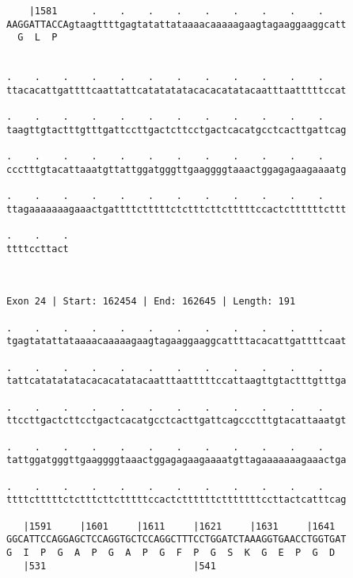 \documentclass{article}
\begin{document}
\begin{Verbatim}
    |1581      .    .    .    .    .    .    .    .    .    
AAGGATTACCAgtaagttttgagtatattataaaacaaaaagaagtagaaggaaggcatt
  G  L  P                                                   
                                                            
  
.    .    .    .    .    .    .    .    .    .    .    .    
ttacacattgattttcaattattcatatatatacacacatatacaatttaatttttccat
                                                            
.    .    .    .    .    .    .    .    .    .    .    .    
taagttgtactttgtttgattccttgactcttcctgactcacatgcctcacttgattcag
                                                            
.    .    .    .    .    .    .    .    .    .    .    .    
ccctttgtacattaaatgttattggatgggttgaaggggtaaactggagagaagaaaatg
                                                            
.    .    .    .    .    .    .    .    .    .    .    .    
ttagaaaaaaagaaactgattttctttttctctttcttctttttccactcttttttcttt
                                                            
.    .    .
ttttccttact
           
           
 
Exon 24 | Start: 162454 | End: 162645 | Length: 191
 
.    .    .    .    .    .    .    .    .    .    .    .    
tgagtatattataaaacaaaaagaagtagaaggaaggcattttacacattgattttcaat
                                                            
.    .    .    .    .    .    .    .    .    .    .    .    
tattcatatatatacacacatatacaatttaatttttccattaagttgtactttgtttga
                                                            
.    .    .    .    .    .    .    .    .    .    .    .    
ttccttgactcttcctgactcacatgcctcacttgattcagccctttgtacattaaatgt
                                                            
.    .    .    .    .    .    .    .    .    .    .    .    
tattggatgggttgaaggggtaaactggagagaagaaaatgttagaaaaaaagaaactga
                                                            
.    .    .    .    .    .    .    .    .    .    .    .    
ttttctttttctctttcttctttttccactcttttttctttttttccttactcatttcag
                                                            
   |1591     |1601     |1611     |1621     |1631     |1641  
GGCATTCCAGGAGCTCCAGGTGCTCCAGGCTTTCCTGGATCTAAAGGTGAACCTGGTGAT
G  I  P  G  A  P  G  A  P  G  F  P  G  S  K  G  E  P  G  D  
   |531                          |541                       
  

\end{Verbatim}
\end{document}
